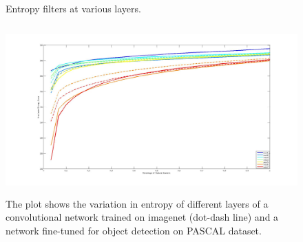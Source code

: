 \documentclass[runningheads]{llncs}
\begin{document}
\begin{figure}
\caption{Entropy filters at various layers.}
\label{fig:example}
\end{figure}


\begin{figure}[H]
\centering
\includegraphics[height=6.5cm]{images/entropy_layers.jpg}
\caption{The plot shows the variation in entropy of different layers of a convolutional network trained on imagenet (dot-dash line) and a network fine-tuned for object detection on PASCAL dataset.}
\label{fig:example}
\end{figure}
\end{document}
